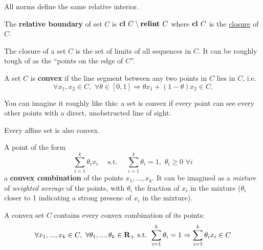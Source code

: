 \begin{Fact}
  All norms define the same relative interior.
\end{Fact}

\begin{Definition}
  The \textbf{relative boundary} of set $C$ is $\textbf{cl }C \setminus \textbf{relint }C$
  where $\textbf{cl }C$ is the \href{https://en.wikipedia.org/wiki/Closure_(mathematics)}{closure} of $C$.
\end{Definition}

\begin{Fact}
  The closure of a set $C$ is the set of limits of all sequences in $C$. It can
  be roughly tough of as the ``points on the edge of $C$''.
\end{Fact}


\begin{Definition}
  A set $C$ is \textbf{convex} if the line segment between any two points in $C$
  lies in $C$, i.e.
  \begin{equation}
    \label{eq:convex_set_definition}
    \forall x_1, x_2\in C,\,\,\forall \theta\in [0,1]\Rightarrow\theta
    x_1+(1-\theta)x_2\in C.
  \end{equation}
\end{Definition}

You can imagine it roughly like this: a set is convex if every point can see
every other points with a direct, unobstructed line of sight.


\begin{Fact}
  Every affine set is also convex. 
\end{Fact}

\begin{Definition}
  A point of the form
  \begin{equation*}
    \sum_{i=1}^k\theta_ix_i\quad\text{ s.t. }\quad\sum_{i=1}^k\theta_i =
    1,\,\,\theta_i\ge 0\,\,\forall i
  \end{equation*}
  a \textbf{convex combination} of the points $x_1,...,x_k$. It can be imagined
  as a \textit{mixture} of \textit{weighted average} of the points, with
  $\theta_i$ the fraction of $x_i$ in the mixture ($\theta_i$ closer to 1
  indicating a strong presenc of $x_i$ in the mixture).
\end{Definition}
\begin{Fact}
  A convex set $C$ contains every convex combination of its points:
  \begin{equation*}
    \forall x_1,...,x_k\in C,\,\,\forall \theta_1,...,\theta_k\in\textbf{R}_+\text{
      s.t. }\sum_{i=1}^k\theta_i=1\Rightarrow \sum_{i=1}^k\theta_ix_i \in C
  \end{equation*}
\end{Fact}

